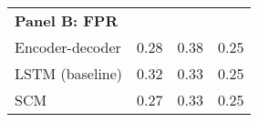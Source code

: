 \begin{tabular}{@{}llll@{}} %
\toprule
\textbf{Panel B: FPR}     \hspace{20mm}         	     &  	\hspace{20mm}					& 		\hspace{20mm}				& \hspace{20mm}	\\ 
Encoder-decoder               &   0.28	          					 &  	0.38 	   					&   	0.25 	   \\  
LSTM (baseline)  				&   	0.32           					&  	0.33  						&   0.25 	   \\ 
SCM   				& \cellcolor{blue!25}0.27		      		  &   \cellcolor{blue!25}0.33			& 	\cellcolor{blue!25}0.25	  \\\bottomrule
\end{tabular}
